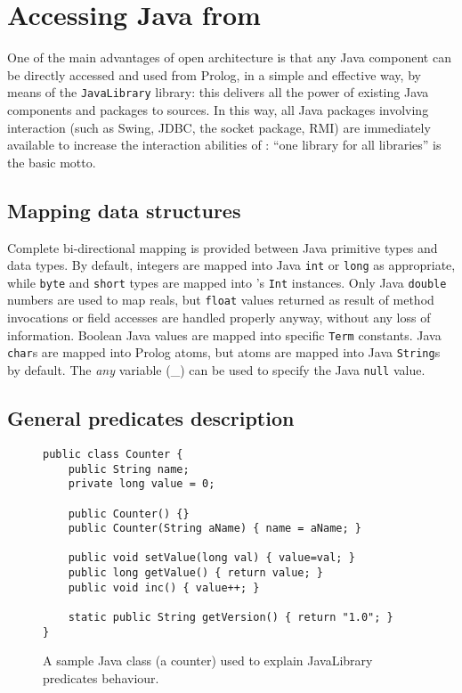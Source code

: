 \chapter{Accessing Java from \tuprolog{}}
\label{ch:java-library}
One of the main advantages of \tuprolog{} open architecture is
that any Java component can be directly accessed and used from
Prolog, in a simple and effective way, by means of the
\texttt{JavaLibrary} library: this delivers all the power of
existing Java components and packages to \tuprolog{} sources.
%
In this way, all Java packages involving interaction (such as Swing,
JDBC, the socket package, RMI) are immediately available to increase
the interaction abilities of \tuprolog:
%
{``one library for all libraries''} is the basic motto.
%
%
\section{Mapping data structures}

Complete bi-directional mapping is provided between Java primitive
types and \tuprolog{} data types.
%
By default, \tuprolog{} integers are mapped into Java \texttt{int}
or \texttt{long} as appropriate, while \texttt{byte} and
\texttt{short} types are mapped into \tuprolog{}'s \texttt{Int}
instances. Only Java \texttt{double} numbers are used to map
\tuprolog{} reals, but \texttt{float} values returned as result of
method invocations or field accesses are handled properly anyway,
without any loss of information.
%
Boolean Java values are mapped into specific \tuprolog{}
\texttt{Term} constants.
%
Java \texttt{char}s are mapped into Prolog atoms, but atoms are
mapped into Java \texttt{String}s by default.
%
The \emph{any} variable (\_) can be used to specify the Java
\texttt{null} value.

\section{General predicates description}

\begin{figure}
\caption{A sample Java class (a counter) used to explain JavaLibrary predicates behaviour.
}
\begin{verbatim}
public class Counter {
    public String name;
    private long value = 0;

    public Counter() {}
    public Counter(String aName) { name = aName; }

    public void setValue(long val) { value=val; }
    public long getValue() { return value; }
    public void inc() { value++; }

    static public String getVersion() { return "1.0"; }
}
\end{verbatim}
\end{figure}

